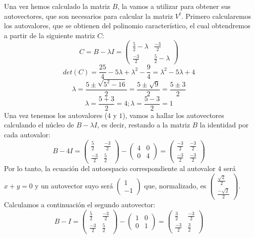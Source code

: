 Una vez hemos calculado la matriz $B$, la vamos a utilizar para obtener sus autovectores, que son necesarios para calcular la matriz $V^t$. Primero calcularemos los autovalores, que se obtienen del polinomio característico, el cual obtendremos a partir de la siguiente matriz $C$:
\[
	C=B-\lambda I=
	\begin{pmatrix}
		\frac{5}{2}-\lambda & \frac{-3}{2}        \\
		\frac{-3}{2}        & \frac{5}{2}-\lambda
	\end{pmatrix}
\]
\[
	det(C)=\frac{25}{4}-5\lambda+\lambda^2-\frac{9}{4}=\lambda^2-5\lambda+4
\]
\[
	\lambda=\frac{5\pm\sqrt{5^2-16}}{2}=\frac{5\pm\sqrt9}{2}=\frac{5\pm3}{2}
\]
\[
	\lambda = \frac{5+3}{2}=4;\lambda=\frac{5-3}{2}=1
\]
Una vez tenemos los autovalores ($4$ y $1$), vamos a hallar los autovectores calculando el núcleo de $B-\lambda I$, es decir, restando a la matriz $B$ la identidad por cada autovalor:
\[
	B-4I=
	\begin{pmatrix}
		\frac{5}{2}  & \frac{-3}{2} \\
		\frac{-3}{2} & \frac{5}{2}
	\end{pmatrix}
	-
	\begin{pmatrix}
		4 & 0 \\
		0 & 4
	\end{pmatrix}
	=
	\begin{pmatrix}
		\frac{-3}{2} & \frac{-3}{2} \\
		\frac{-3}{2} & \frac{-3}{2}
	\end{pmatrix}
\]
Por lo tanto, la ecuación del autoespacio correspondiente al autovalor $4$ será $x+y=0$ y un autovector suyo será $\begin{pmatrix}
		1 \\
		-1
	\end{pmatrix}$
que, normalizado, es $\begin{pmatrix}
		\frac{\sqrt2}{2} \\
		\frac{-\sqrt2}{2}
	\end{pmatrix}$.
Calculamos a continuación el segundo autovector:
\[
	B-I=
	\begin{pmatrix}
		\frac{5}{2}  & \frac{-3}{2} \\
		\frac{-3}{2} & \frac{5}{2}
	\end{pmatrix}
	-
	\begin{pmatrix}
		1 & 0 \\
		0 & 1
	\end{pmatrix}
	=
	\begin{pmatrix}
		\frac{3}{2}  & \frac{-3}{2} \\
		\frac{-3}{2} & \frac{3}{2}
	\end{pmatrix}
\]
